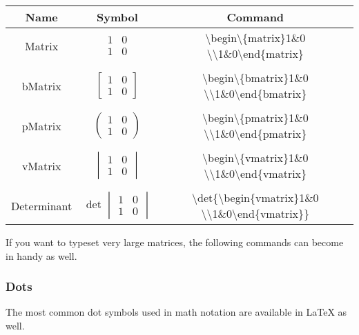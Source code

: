 \begin{center}
\begin{tabular}{ccc}
\toprule  %
Name&	Symbol&	Command\\
\midrule  %
Matrix 
  & $\begin{matrix}1&0\\1&0\end{matrix}$ 
  & \textbackslash begin\textbackslash\{matrix\}1\&0 \textbackslash\textbackslash 1\&0\textbackslash end\{matrix\} \\
\\
bMatrix 
  & $\begin{bmatrix}1&0\\1&0\end{bmatrix}$ 
  & \textbackslash begin\textbackslash\{bmatrix\}1\&0 \textbackslash\textbackslash 1\&0\textbackslash end\{bmatrix\} \\
\\
pMatrix 
  & $\begin{pmatrix}1&0\\1&0\end{pmatrix}$ 
  & \textbackslash begin\textbackslash\{pmatrix\}1\&0 \textbackslash\textbackslash 1\&0\textbackslash end\{pmatrix\} \\
\\
vMatrix 
  & $\begin{vmatrix}1&0\\1&0\end{vmatrix}$ 
  & \textbackslash begin\textbackslash\{vmatrix\}1\&0 \textbackslash\textbackslash 1\&0\textbackslash end\{vmatrix\} \\
\\
Determinant 
  & $\det{\begin{vmatrix}1&0\\1&0\end{vmatrix}}$ 
  & \textbackslash det\{\textbackslash begin\{vmatrix\}1\&0 \textbackslash\textbackslash 1\&0\textbackslash end\{vmatrix\}\} \\
\bottomrule %
\end{tabular}
\end{center}
If you want to typeset very large matrices, the following commands can become in handy as well.




\subsubsection{Dots}
The most common dot symbols used in math notation are available in LaTeX as well.

